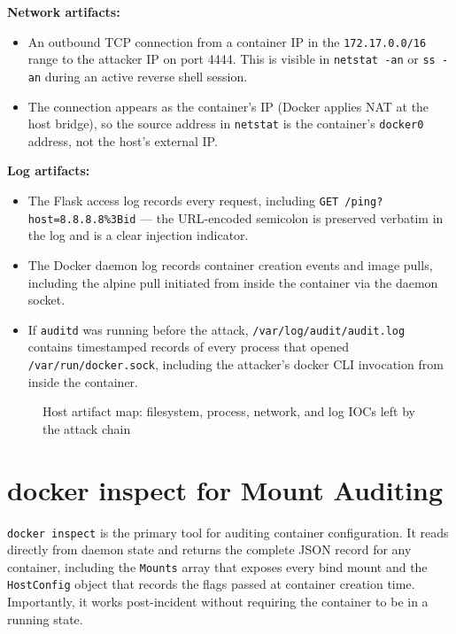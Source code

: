 \textbf{Network artifacts:}
\begin{itemize}
    \item An outbound TCP connection from a container IP in the \texttt{172.17.0.0/16} range to the attacker IP on port 4444. This is visible in \texttt{netstat -an} or \texttt{ss -an} during an active reverse shell session.
    \item The connection appears as the container's IP (Docker applies NAT at the host bridge), so the source address in \texttt{netstat} is the container's \texttt{docker0} address, not the host's external IP.
\end{itemize}

\textbf{Log artifacts:}
\begin{itemize}
    \item The Flask access log records every request, including \texttt{GET /ping?host=8.8.8.8\%3Bid} --- the URL-encoded semicolon is preserved verbatim in the log and is a clear injection indicator.
    \item The Docker daemon log records container creation events and image pulls, including the alpine pull initiated from inside the container via the daemon socket.
    \item If \texttt{auditd} was running before the attack, \texttt{/var/log/audit/audit.log} contains timestamped records of every process that opened \texttt{/var/run/docker.sock}, including the attacker's docker CLI invocation from inside the container.
\end{itemize}

\begin{figure}[h]
\centering
\vspace{3cm}
\caption{Host artifact map: filesystem, process, network, and log IOCs left by the attack chain}
\end{figure}


\section{docker inspect for Mount Auditing}

\texttt{docker inspect} is the primary tool for auditing container configuration. It reads directly from daemon state and returns the complete JSON record for any container, including the \texttt{Mounts} array that exposes every bind mount and the \texttt{HostConfig} object that records the flags passed at container creation time. Importantly, it works post-incident without requiring the container to be in a running state.

